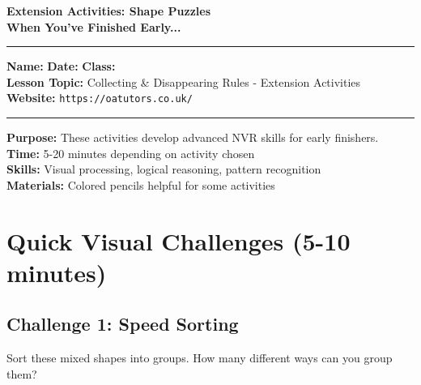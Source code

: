 \documentclass{article}
\begin{document}
\onehalfspacing

\begin{center}
\textbf{\Large Extension Activities: Shape Puzzles}\\
\textbf{\large When You've Finished Early...}
\vspace{0.2cm}
\end{center}

\hrule
\vspace{0.1cm}

\textbf{Name:} \underline{\hspace{4cm}} \quad \textbf{Date:} \underline{\hspace{3cm}} \quad \textbf{Class:} \underline{\hspace{2cm}} \\
\textbf{Lesson Topic:} Collecting \& Disappearing Rules - Extension Activities \\
\textbf{Website:} \texttt{https://oatutors.co.uk/}

\vspace{0.2cm}
\hrule
\vspace{0.3cm}

\begin{tcolorbox}[colback=purple!5,colframe=purple!60,title=Teacher Instructions]
\textbf{Purpose:} These activities develop advanced NVR skills for early finishers.\\
\textbf{Time:} 5-20 minutes depending on activity chosen\\
\textbf{Skills:} Visual processing, logical reasoning, pattern recognition\\
\textbf{Materials:} Colored pencils helpful for some activities
\end{tcolorbox}

\section{Quick Visual Challenges (5-10 minutes)}

\subsection*{Challenge 1: Speed Sorting}
Sort these mixed shapes into groups. How many different ways can you group them?

\begin{center}
\end{center}
\end{document}
